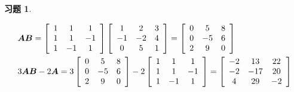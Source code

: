 \documentclass{ctexart}
\newtheorem{problem}{习题}[section]
\begin{document}
\begin{problem}\

\begin{align*}
     & \boldsymbol{A}\boldsymbol{B}           =
    \left[\begin{array}{ccc}
                  1 & 1  & 1  \\
                  1 & 1  & -1 \\
                  1 & -1 & 1
              \end{array}\right]
    \left[\begin{array}{ccc}
                  1  & 2  & 3 \\
                  -1 & -2 & 4 \\
                  0  & 5  & 1
              \end{array}\right]=
    \left[\begin{array}{ccc}
                  0 & 5  & 8 \\
                  0 & -5 & 6 \\
                  2 & 9  & 0
              \end{array}\right]  \\
     & 3\boldsymbol{A}\boldsymbol{B}-2 \boldsymbol{A}  =
    3\left[\begin{array}{ccc}
                   0 & 5  & 8 \\
                   0 & -5 & 6 \\
                   2 & 9  & 0
               \end{array}\right]
    -2\left[\begin{array}{ccc}
                    1 & 1  & 1  \\
                    1 & 1  & -1 \\
                    1 & -1 & 1
                \end{array}\right]
    =\left[\begin{array}{ccc}
                   -2 & 13  & 22 \\
                   -2 & -17 & 20 \\
                   4  & 29  & -2
               \end{array}\right]
\end{align*}
\end{problem}
\end{document}
